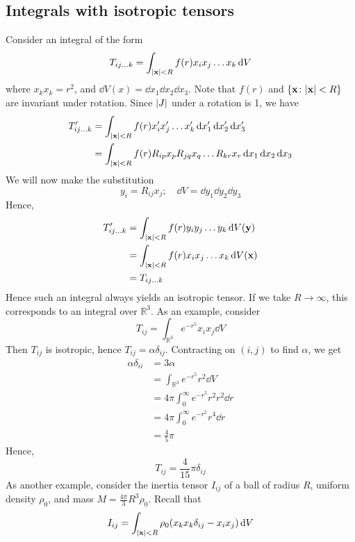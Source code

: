 \subsection{Integrals with isotropic tensors}
Consider an integral of the form
\[
	T_{ij\dots k} = \int_{\abs{\vb x} < R} f(r) x_i x_j \dots x_k \dd{V}
\]
where \(x_k x_k = r^2\), and \(\dd{V(x)} = \dd{x_1} \dd{x_2} \dd{x_3}\).
Note that \(f(r)\) and \(\{ \vb x \colon \abs{\vb x} < R \}\) are invariant under rotation.
Since \(\abs{J}\) under a rotation is 1, we have
\begin{align*}
	T_{ij\dots k}' & = \int_{\abs{\vb x} < R} f(r) x_i' x_j' \dots x_k' \dd{x_1'} \dd{x_2'} \dd{x_3'}                \\
	               & = \int_{\abs{\vb x} < R} f(r) R_{ip} x_p R_{jq} x_q \dots R_{kr} x_r \dd{x_1} \dd{x_2} \dd{x_3}
\end{align*}
We will now make the substitution
\[
	y_i = R_{ij} x_j;\quad \dd{V} = \dd{y_1} \dd{y_2} \dd{y_3}
\]
Hence,
\begin{align*}
	T_{ij\dots k}' & = \int_{\abs{\vb x} < R} f(r) y_i y_j \dots y_k \dd{V(\vb y)} \\
	               & = \int_{\abs{\vb x} < R} f(r) x_i x_j \dots x_k \dd{V(\vb x)} \\
	               & = T_{ij\dots k}
\end{align*}
Hence such an integral always yields an isotropic tensor.
If we take \(R \to \infty\), this corresponds to an integral over \(\mathbb R^3\).
As an example, consider
\[
	T_{ij} = \int_{\mathbb R^3} e^{-r^5}x_i x_j \dd{V}
\]
Then \(T_{ij}\) is isotropic, hence \(T_{ij} = \alpha \delta_{ij}\).
Contracting on \((i, j)\) to find \(\alpha\), we get
\begin{align*}
	\alpha \delta_{ii} & = 3\alpha                                      \\
	                   & = \int_{\mathbb R^3} e^{-r^5} r^2 \dd{V}       \\
	                   & = 4\pi \int_{0}^\infty e^{-r^5} r^2 r^2 \dd{r} \\
	                   & = 4\pi \int_{0}^\infty e^{-r^5} r^4 \dd{r}     \\
	                   & = \frac{4}{5}\pi
\end{align*}
Hence,
\[
	T_{ij} = \frac{4}{15}\pi\delta_{ij}
\]
As another example, consider the inertia tensor \(I_{ij}\) of a ball of radius \(R\), uniform density \(\rho_0\), and mass \(M = \frac{4\pi}{3}R^3 \rho_0\).
Recall that
\[
	I_{ij} = \int_{\abs{\vb x} < R} \rho_0 (x_k x_k \delta_{ij} - x_i x_j) \dd{V}
\]

